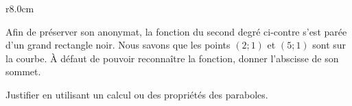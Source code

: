 
\begin{exercice}\label{exosmath-0146}

\begin{wrapfigure}{r}{8.0cm}
   \vspace{-0.5cm}        %
   \centering
   
\end{wrapfigure}
    Afin de préserver son anonymat, la fonction du second degré ci-contre s'est parée d'un grand rectangle noir. Nous savons que les points \( (2;1)\) et \( (5;1)\) sont sur la courbe. À défaut de pouvoir reconnaître la fonction, donner l'abscisse de son sommet.

    Justifier en utilisant un calcul ou des propriétés des paraboles.

\end{exercice}
